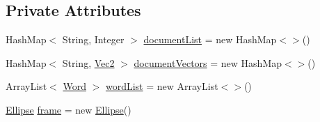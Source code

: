 \subsection*{Private Attributes}
\begin{DoxyCompactItemize}
\item 
Hash\+Map$<$ String, Integer $>$ \mbox{\hyperlink{classio_1_1github_1_1syzygy2048_1_1radcloud_1_1_document_manager_aebb5c1d79109552b3b85ce9ee7a971ab}{document\+List}} = new Hash\+Map$<$$>$()
\item 
Hash\+Map$<$ String, \mbox{\hyperlink{classio_1_1github_1_1syzygy2048_1_1radcloud_1_1_document_manager_1_1_vec2}{Vec2}} $>$ \mbox{\hyperlink{classio_1_1github_1_1syzygy2048_1_1radcloud_1_1_document_manager_ae09195d3ddec27f4cf496d0ed87bab26}{document\+Vectors}} = new Hash\+Map$<$$>$()
\item 
Array\+List$<$ \mbox{\hyperlink{classio_1_1github_1_1syzygy2048_1_1radcloud_1_1_word}{Word}} $>$ \mbox{\hyperlink{classio_1_1github_1_1syzygy2048_1_1radcloud_1_1_document_manager_a723b2b3488074851d4523c37a33ce6b8}{word\+List}} = new Array\+List$<$$>$()
\item 
\mbox{\hyperlink{classio_1_1github_1_1syzygy2048_1_1radcloud_1_1_document_manager_1_1_ellipse}{Ellipse}} \mbox{\hyperlink{classio_1_1github_1_1syzygy2048_1_1radcloud_1_1_document_manager_a6122082006d279500cdcc27e03298310}{frame}} = new \mbox{\hyperlink{classio_1_1github_1_1syzygy2048_1_1radcloud_1_1_document_manager_1_1_ellipse}{Ellipse}}()
\item 
$$
\end{DoxyCompactItemize}
